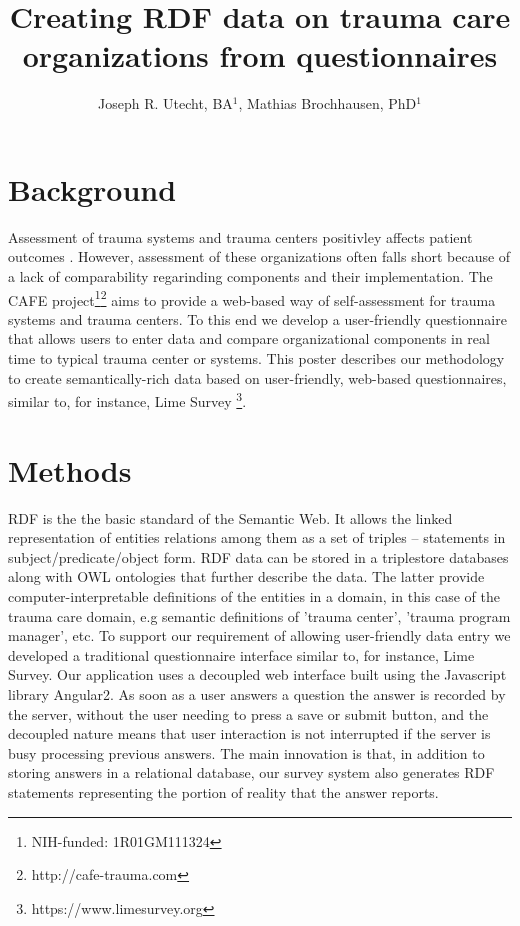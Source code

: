 \documentclass{amia}
\begin{document}
\title{Creating RDF data on trauma care organizations from questionnaires}

\author{Joseph R. Utecht, BA$^{1}$, Mathias Brochhausen, PhD$^{1}$}


\maketitle

\section*{Background}

Assessment of trauma systems and trauma centers positivley affects patient outcomes \cite{ref1, ref2}.
However, assessment of these organizations often falls short because of a lack of comparability regarinding components and their implementation.
The CAFE project\footnote{NIH-funded: 1R01GM111324}\footnote{http://cafe-trauma.com} aims to provide a web-based way of self-assessment for trauma systems and trauma centers. 
To this end we develop a user-friendly questionnaire that allows users to enter data and compare organizational components in real time to typical trauma center or systems.
This poster describes our methodology to create semantically-rich data based on user-friendly, web-based questionnaires, similar to, for instance, Lime Survey \footnote{https://www.limesurvey.org}. 

\section*{Methods}
RDF is the the basic standard of the Semantic Web. It allows the linked representation of entities relations among them as a set of triples -- statements in subject/predicate/object form. RDF data can be stored in a triplestore databases along with OWL ontologies that further describe the data. The latter provide computer-interpretable definitions of the entities in  a domain, in this case of the trauma care domain, e.g semantic definitions of 'trauma center', 'trauma program manager', etc. 
To support our requirement of allowing user-friendly data entry we developed a traditional questionnaire interface similar to, for instance, Lime Survey\cite{TODO}. 
Our application uses a decoupled web interface built using the Javascript library Angular2\cite{TODO}.
As soon as a user answers a question the answer is recorded by the server, without the user needing to press a save or submit button, and the decoupled nature means that user interaction is not interrupted if the server is busy processing previous answers.
The main innovation is that, in addition to storing answers in a relational database, our survey system also generates RDF statements representing the portion of reality that the answer reports.
\end{document}
